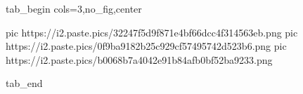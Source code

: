  
 
 
 
 


\ifcmt
  tab_begin cols=3,no_fig,center

     pic https://i2.paste.pics/32247f5d9f871e4bf66dcc4f314563eb.png
		 pic https://i2.paste.pics/0f9ba9182b25c929cf57495742d523b6.png
		 pic https://i2.paste.pics/b0068b7a4042e91b84afb0bf52ba9233.png

  tab_end
\fi
